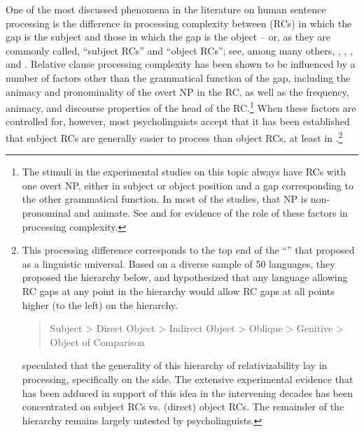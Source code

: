 \documentclass[output=paper
                ,modfonts
                ,nonflat
	        ,collection
	        ,collectionchapter
	        ,collectiontoclongg
 	        ,biblatex
                ,babelshorthands
                ,newtxmath
                ,draftmode
                ,colorlinks, citecolor=brown
]{./langsci/langscibook}
\begin{document}
One of the most discussed phenomena in the literature on human sentence processing is the difference in processing complexity between  (RCs) in which the gap is the subject and those in which the gap is the object -- or, as they are commonly called, ``subject RCs'' and ``object RCs''; see, among many others, \citet{WannerMaratsos78}, \citet{Gibson98a}, \citet{TraxlerEtal2002}, and \citet{GennariMacDonald2008}.  Relative clause processing complexity has been shown to be influenced by a number of factors other than the grammatical function of the gap, including the animacy and pronominality of the overt NP in the RC, as well as the frequency, animacy, and discourse properties of the head of the RC.\footnote{The stimuli in the experimental studies on this topic always have RCs with one overt NP, either in subject or object position and a gap corresponding to the other grammatical function. In most of the studies, that NP is non-pronominal and animate.  See \citet{RealiChristiansen07} and \citet{RolandEtal2012} for evidence of the role of these factors in processing complexity.} When these factors are controlled for, however, most psycholinguists accept that it has been established that subject RCs are generally easier to process than object RCs, at least in .\footnote{This processing difference corresponds to the top end of the ``'' that \citet{KC77a} proposed as a linguistic universal. Based on a diverse sample of 50 languages, they proposed the hierarchy below, and hypothesized that any language allowing RC gaps at any point in the hierarchy would allow RC gaps at all points higher (to the left) on the hierarchy.
\begin{quote}

Subject 
> 
Direct Object 
> 
Indirect Object 
> 
Oblique 
> 
Genitive
> 
Object of Comparison
\end{quote}
\citeauthor{KC77a} speculated that the generality of this hierarchy of relativizability lay in processing, specifically on the  side.  The extensive experimental evidence that has been adduced in support of this idea in the intervening decades has been concentrated on subject RCs vs. (direct) object RCs.  The remainder of the hierarchy remains largely untested by psycholinguists.}
\end{document}
